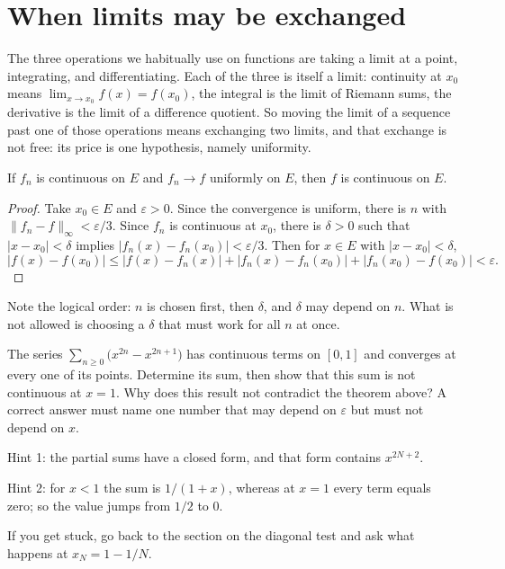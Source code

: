 \section{When limits may be exchanged}

The three operations we habitually use on functions are taking a limit at
a point, integrating, and differentiating. Each of the three is itself a limit:
continuity at $x_0$ means $\lim_{x\to x_0}f(x)=f(x_0)$, the integral is the
limit of Riemann sums, the derivative is the limit of a difference quotient. So moving the
limit of a sequence past one of those operations means exchanging two limits, and
that exchange is not free: its price is one hypothesis, namely
uniformity.

\begin{teorema}
If $f_n$ is continuous on $E$ and $f_n\to f$ uniformly on $E$, then $f$ is continuous
on $E$.
\end{teorema}

\begin{proof}
Take $x_0\in E$ and $\varepsilon>0$. Since the convergence is uniform, there is $n$
with $\|f_n-f\|_\infty<\varepsilon/3$. Since $f_n$ is continuous at $x_0$, there is
$\delta>0$ such that $|x-x_0|<\delta$ implies $|f_n(x)-f_n(x_0)|<\varepsilon/3$.
Then for $x\in E$ with $|x-x_0|<\delta$,
\[
  |f(x)-f(x_0)|\le|f(x)-f_n(x)|+|f_n(x)-f_n(x_0)|+|f_n(x_0)-f(x_0)|
  <\varepsilon .
\]
\end{proof}

Note the logical order: $n$ is chosen first, then $\delta$, and
$\delta$ may depend on $n$. What is not allowed is choosing a $\delta$
that must work for all $n$ at once.

\begin{tantangan}
The series $\sum_{n\ge0}\bigl(x^{2n}-x^{2n+1}\bigr)$ has continuous terms on $[0,1]$
and converges at every one of its points. Determine its sum, then show that this sum
is not continuous at $x=1$. Why does this result not contradict the theorem above?
A correct answer must name one number that may depend on $\varepsilon$ but must not
depend on $x$.

Hint 1: the partial sums have a closed form, and that form contains
$x^{2N+2}$.

Hint 2: for $x<1$ the sum is $1/(1+x)$, whereas at $x=1$ every term
equals zero; so the value jumps from $1/2$ to $0$.

If you get stuck, go back to the section on the diagonal test and ask what happens at
$x_N=1-1/N$.
\end{tantangan}

